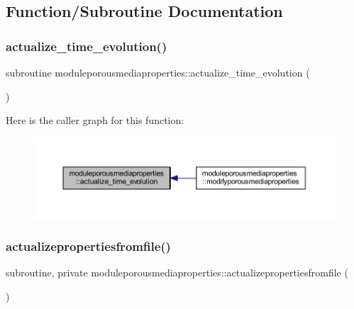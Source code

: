 \subsection{Function/\+Subroutine Documentation}
\mbox{\label{namespacemoduleporousmediaproperties_a2538954ade5763189d6d5f04ad4e7882}} 
\subsubsection{\texorpdfstring{actualize\+\_\+time\+\_\+evolution()}{actualize\_time\_evolution()}}
{\footnotesize\ttfamily subroutine moduleporousmediaproperties\+::actualize\+\_\+time\+\_\+evolution (\begin{DoxyParamCaption}{ }\end{DoxyParamCaption})\hspace{0.3cm}{\ttfamily [private]}}

Here is the caller graph for this function\+:\nopagebreak
\begin{figure}[H]
\begin{center}
\leavevmode
\includegraphics[width=350pt]{namespacemoduleporousmediaproperties_a2538954ade5763189d6d5f04ad4e7882_icgraph}
\end{center}
\end{figure}
\mbox{\label{namespacemoduleporousmediaproperties_a34afbe14179f6a786f5504a52ce2d220}} 
\subsubsection{\texorpdfstring{actualizepropertiesfromfile()}{actualizepropertiesfromfile()}}
{\footnotesize\ttfamily subroutine, private moduleporousmediaproperties\+::actualizepropertiesfromfile (\begin{DoxyParamCaption}{ }\end{DoxyParamCaption})\hspace{0.3cm}{\ttfamily [private]}}

